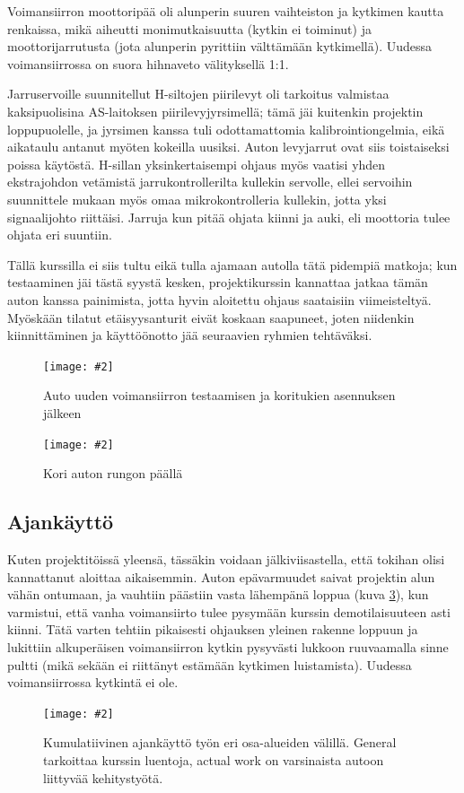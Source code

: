 \documentclass{article}
\newcommand{\kuvaa}[4]{%
	\begin{figure}[h]%
		\centering \texttt{[image: \#2]}%
		\caption{#3 \label{fig:#4}}%
	\end{figure}%
}
\begin{document}
Voimansiirron moottoripää oli alunperin suuren vaihteiston ja kytkimen kautta renkaissa, mikä aiheutti monimutkaisuutta (kytkin ei toiminut) ja moottorijarrutusta (jota alunperin pyrittiin välttämään kytkimellä). Uudessa voimansiirrossa on suora hihnaveto välityksellä 1:1.

Jarruservoille suunnitellut H-siltojen piirilevyt oli tarkoitus valmistaa kaksipuolisina AS-laitoksen piirilevyjyrsimellä; tämä jäi kuitenkin projektin loppupuolelle, ja jyrsimen kanssa tuli odottamattomia kalibrointiongelmia, eikä aikataulu antanut myöten kokeilla uusiksi. Auton levyjarrut ovat siis toistaiseksi poissa käytöstä. H-sillan yksinkertaisempi ohjaus myös vaatisi yhden ekstrajohdon vetämistä jarrukontrollerilta kullekin servolle, ellei servoihin suunnittele mukaan myös omaa mikrokontrolleria kullekin, jotta yksi signaalijohto riittäisi. Jarruja kun pitää ohjata kiinni ja auki, eli moottoria tulee ohjata eri suuntiin.

Tällä kurssilla ei siis tultu eikä tulla ajamaan autolla tätä pidempiä matkoja; kun testaaminen jäi tästä syystä kesken, projektikurssin kannattaa jatkaa tämän auton kanssa painimista, jotta hyvin aloitettu ohjaus saataisiin viimeisteltyä. Myöskään tilatut etäisyysanturit eivät koskaan saapuneet, joten niidenkin kiinnittäminen ja käyttöönotto jää seuraavien ryhmien tehtäväksi.

\kuvaa{0.8}{autoauki}{Auto uuden voimansiirron testaamisen ja koritukien asennuksen jälkeen}{autoauki}
\kuvaa{0.8}{autonkori}{Kori auton rungon päällä}{autonkori}

\subsection{Ajankäyttö}

Kuten projektitöissä yleensä, tässäkin voidaan jälkiviisastella, että tokihan olisi kannattanut aloittaa aikaisemmin. Auton epävarmuudet saivat projektin alun vähän ontumaan, ja vauhtiin päästiin vasta lähempänä loppua (kuva \ref{fig:tyojakauma}), kun varmistui, että vanha voimansiirto tulee pysymään kurssin demotilaisuuteen asti kiinni. Tätä varten tehtiin pikaisesti ohjauksen yleinen rakenne loppuun ja lukittiin alkuperäisen voimansiirron kytkin pysyvästi lukkoon ruuvaamalla sinne pultti (mikä sekään ei riittänyt estämään kytkimen luistamista). Uudessa voimansiirrossa kytkintä ei ole.

\kuvaa{1}{jakauma}{Kumulatiivinen ajankäyttö työn eri osa-alueiden välillä. General tarkoittaa kurssin luentoja, actual work on varsinaista autoon liittyvää kehitystyötä.}{tyojakauma}
\end{document}
